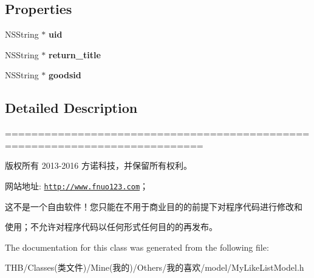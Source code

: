 \subsection*{Properties}
\begin{DoxyCompactItemize}
\item 
\mbox{\label{interface_my_like_list_model_acd9d8a7d8d8236b510eb43a66bd3b615}} 
N\+S\+String $\ast$ {\bfseries uid}
\item 
\mbox{\label{interface_my_like_list_model_a0dfc0ad1a0d42a6363f8aabfa930b1ec}} 
N\+S\+String $\ast$ {\bfseries return\+\_\+title}
\item 
\mbox{\label{interface_my_like_list_model_a4df16b2df296a87c2ac7302a65d7473e}} 
N\+S\+String $\ast$ {\bfseries goodsid}
\end{DoxyCompactItemize}


\subsection{Detailed Description}
============================================================================

版权所有 2013-\/2016 方诺科技，并保留所有权利。

网站地址\+: \href{http://www.fnuo123.com}{\tt http\+://www.\+fnuo123.\+com}； 



这不是一个自由软件！您只能在不用于商业目的的前提下对程序代码进行修改和

使用；不允许对程序代码以任何形式任何目的的再发布。 

 

The documentation for this class was generated from the following file\+:\begin{DoxyCompactItemize}
\item 
T\+H\+B/\+Classes(类文件)/\+Mine(我的)/\+Others/我的喜欢/model/My\+Like\+List\+Model.\+h\end{DoxyCompactItemize}
